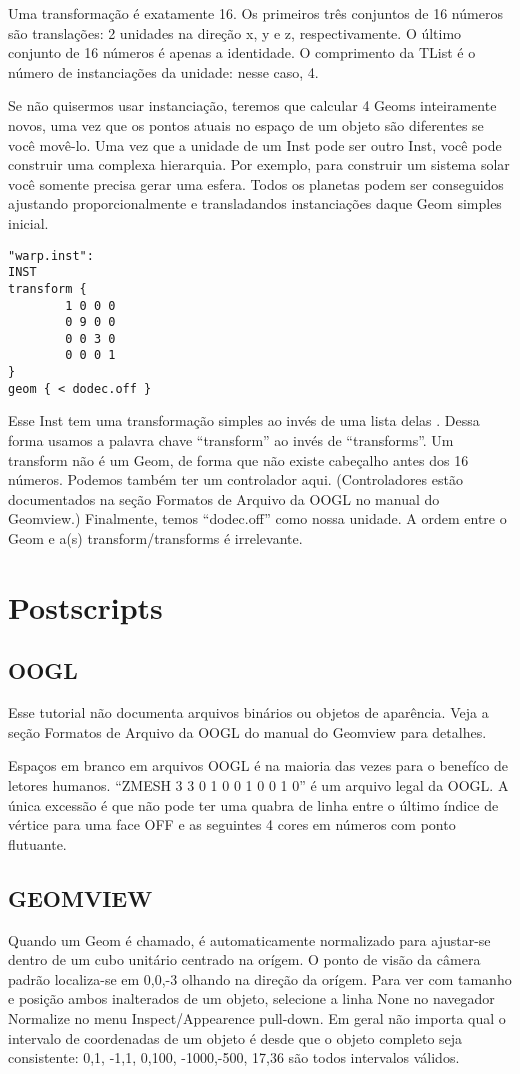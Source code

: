 \documentclass[12pt,a4paper]{book}
\begin{document}
Uma transformação é exatamente 16. Os primeiros três conjuntos de 16 números são translações:
2 unidades na direção x, y e z, respectivamente. O último conjunto de 16 números é apenas
a identidade. O comprimento da TList é o número de instanciações da unidade: nesse caso, 4.

Se não quisermos usar instanciação, teremos que calcular 4
Geoms inteiramente novos, uma vez que os pontos atuais no espaço de um objeto são
diferentes se você movê-lo. Uma vez que a unidade de um Inst pode ser outro
Inst, você pode construir uma complexa hierarquia. Por exemplo, para construir um
sistema solar você somente precisa gerar uma esfera. Todos os planetas podem ser
conseguidos ajustando proporcionalmente e transladandos instanciações daque Geom simples inicial.

\begin{verbatim}
"warp.inst":
INST
transform {
		1 0 0 0
		0 9 0 0
		0 0 3 0
		0 0 0 1
}
geom { < dodec.off }
\end{verbatim}

Esse Inst tem uma transformação simples ao invés de uma lista delas . Dessa forma
usamos a palavra chave ``transform'' ao invés de ``transforms''. Um transform não
é um Geom, de forma que não existe cabeçalho antes dos 16 números. Podemos também
ter um controlador aqui.  (Controladores estão documentados na seção Formatos de Arquivo da
OOGL no manual do Geomview.) Finalmente, temos ``dodec.off'' como nossa
unidade.  A ordem entre o Geom e a(s) transform/transforms é
irrelevante.


\chapter{Postscripts}

\section{OOGL}

Esse tutorial não documenta arquivos binários ou objetos de aparência.
Veja a seção Formatos de Arquivo da OOGL do manual do Geomview para detalhes. 

Espaços em branco em arquivos OOGL é na maioria das vezes para o benefíco de letores humanos.
``ZMESH 3 3 0 1 0 0 1 0 0 1 0'' é um arquivo legal da OOGL.  A única
excessão é que não pode ter uma quabra de linha entre o último índice de
vértice para uma face OFF e as seguintes 4 cores em números com ponto flutuante.

\section{GEOMVIEW}

Quando um Geom é chamado, é automaticamente normalizado para ajustar-se dentro de um
cubo unitário centrado na orígem. O ponto de visão da câmera padrão localiza-se em
{0,0,-3} olhando na direção da orígem. Para ver com tamanho e posição
ambos inalterados de um objeto, selecione a linha None no navegador Normalize
no menu Inspect/Appearence pull-down. Em geral não importa qual o intervalo de
coordenadas de um objeto é desde que o objeto completo seja consistente: {0,1},
{-1,1}, {0,100}, {-1000,-500}, {17,36} são todos intervalos válidos.
\end{document}
